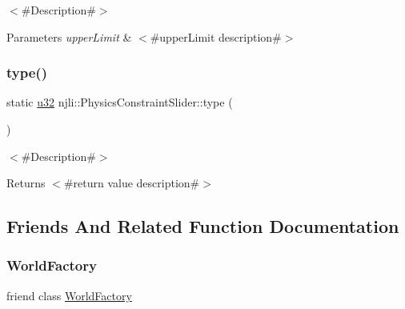 $<$\#\+Description\#$>$


\begin{DoxyParams}{Parameters}
{\em upper\+Limit} & $<$\#upper\+Limit description\#$>$ \\
\hline
\end{DoxyParams}
\mbox{\label{classnjli_1_1_physics_constraint_slider_a583e96bac901b7464d7cf2272a2d57f8}} 
\subsubsection{\texorpdfstring{type()}{type()}}
{\footnotesize\ttfamily static \mbox{\hyperlink{_util_8h_a10e94b422ef0c20dcdec20d31a1f5049}{u32}} njli\+::\+Physics\+Constraint\+Slider\+::type (\begin{DoxyParamCaption}{ }\end{DoxyParamCaption})\hspace{0.3cm}{\ttfamily [static]}}

$<$\#\+Description\#$>$

\begin{DoxyReturn}{Returns}
$<$\#return value description\#$>$ 
\end{DoxyReturn}


\subsection{Friends And Related Function Documentation}
\mbox{\label{classnjli_1_1_physics_constraint_slider_acb96ebb09abe8f2a37a915a842babfac}} 
\subsubsection{\texorpdfstring{World\+Factory}{WorldFactory}}
{\footnotesize\ttfamily friend class \mbox{\hyperlink{classnjli_1_1_world_factory}{World\+Factory}}\hspace{0.3cm}{\ttfamily [friend]}}




